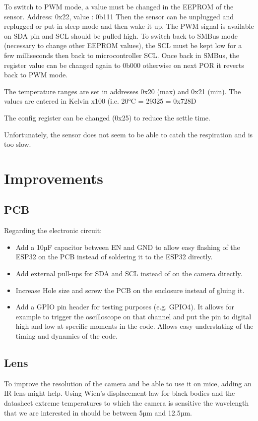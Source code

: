 \documentclass[a4paper]{article}
\begin{document}
To switch to PWM mode, a value must be changed in the EEPROM of the sensor. Address: 0x22, value : 0b111
Then the sensor can be unplugged and replugged or put in sleep mode and then wake it up. The PWM signal is available on SDA pin and SCL should be pulled high.
To switch back to SMBus mode (necessary to change other EEPROM values), the SCL must be kept low for a few milliseconds then back to microcontroller SCL. Once back in SMBus, the register value can be changed again to 0b000 otherwise on next POR it reverts back to PWM mode.

The temperature ranges are set in addresses 0x20 (max) and 0x21 (min). The values are entered in Kelvin x100 (i.e. 20°C = 29325 = 0x728D

The config register can be changed (0x25) to reduce the settle time.

Unfortunately, the sensor does not seem to be able to catch the respiration and is too slow.

\section{Improvements}
\subsection{PCB}
Regarding the electronic circuit:
\begin{itemize}
    \item Add a 10µF capacitor between EN and GND to allow easy flashing of the ESP32 on the PCB instead of soldering it to the ESP32 directly.
    \item Add external pull-ups for SDA and SCL instead of on the camera directly.
    \item Increase Hole size and screw the PCB on the enclosure instead of gluing it.
    \item Add a GPIO pin header for testing purposes (e.g.  GPIO4). It allows for example to trigger the oscilloscope on that channel and put the pin to digital high and low at specific moments in the code. Allows easy understating of the timing and dynamics of the code.
\end{itemize}

\subsection{Lens}
To improve the resolution of the camera and be able to use it on mice, adding an IR lens might help.
Using Wien's displacement law for black bodies and the datasheet extreme temperatures to which the camera is sensitive the wavelength that we are interested in should be between 5µm and 12.5µm.
\end{document}

